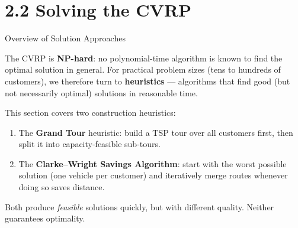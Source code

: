 \documentclass[aspectratio=169,10pt]{beamer}
\begin{document}
\section{2.2 Solving the CVRP}

\begin{frame}[allowframebreaks]{Overview of Solution Approaches}

  The CVRP is \textbf{NP-hard}: no polynomial-time algorithm is known to find
  the optimal solution in general.  For practical problem sizes (tens to
  hundreds of customers), we therefore turn to \textbf{heuristics} ---
  algorithms that find good (but not necessarily optimal) solutions in
  reasonable time.

  \bigskip
  This section covers two construction heuristics:
  \begin{enumerate}
    \item The \textbf{Grand Tour} heuristic: build a TSP tour over all customers
      first, then split it into capacity-feasible sub-tours.
    \item The \textbf{Clarke--Wright Savings Algorithm}: start with the worst
      possible solution (one vehicle per customer) and iteratively merge routes
      whenever doing so saves distance.
  \end{enumerate}

  Both produce \emph{feasible} solutions quickly, but with different quality.
  Neither guarantees optimality.

\end{frame}
\end{document}
